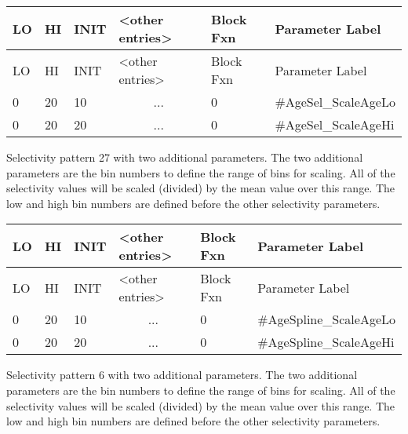 	\begin{longtable}{p{1cm} p{1cm} p{1cm} p{2.9cm}  p{1.9cm}  p{4.2cm}}
		\hline
		LO \Tstrut & HI & INIT  &  <other entries> & Block Fxn & Parameter Label\Bstrut\\
		\hline
		\endfirsthead
	
		\hline
		LO \Tstrut & HI & INIT & <other entries> & Block Fxn & Parameter Label\Bstrut\\
		\hline
		\endhead

		0 & 20 & 10 & \multicolumn{1}{c}{...} & 0 & \#AgeSel\_ScaleAgeLo \Tstrut\\
		0 & 20 & 20 & \multicolumn{1}{c}{...} & 0 & \#AgeSel\_ScaleAgeHi \Bstrut\\
		\hline
	\end{longtable}


Selectivity pattern 27 with two additional parameters. The two additional parameters are the bin numbers to define the range of bins for scaling. All of the selectivity values will be scaled (divided) by the mean value over this range. The low and high bin numbers are defined before the other selectivity parameters.

	\begin{longtable}{p{1cm} p{1cm} p{1cm} p{2.9cm}  p{1.9cm}  p{4.2cm}}
		\hline
		LO \Tstrut & HI & INIT  &  <other entries> & Block Fxn & Parameter Label\Bstrut\\
		\hline
		\endfirsthead
	
		\hline
		LO \Tstrut & HI & INIT & <other entries> & Block Fxn & Parameter Label\Bstrut\\
		\hline
		\endhead

		0 & 20 & 10 & \multicolumn{1}{c}{...} & 0 & \#AgeSpline\_ScaleAgeLo\Tstrut\\
		0 & 20 & 20 & \multicolumn{1}{c}{...} & 0 & \#AgeSpline\_ScaleAgeHi\Bstrut\\
		\hline
	\end{longtable}

Selectivity pattern 6 with two additional parameters. The two additional parameters are the bin numbers to define the range of bins for scaling. All of the selectivity values will be scaled (divided) by the mean value over this range. The low and high bin numbers are defined before the other selectivity parameters.
	
